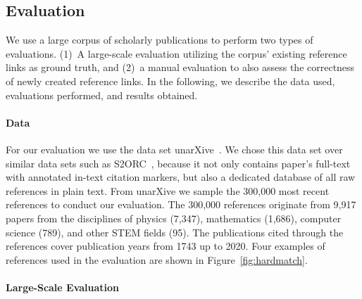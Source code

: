 \subsection{Evaluation}\label{sec:eval}

We use a large corpus of scholarly publications to perform two types of evaluations. (1)~A large-scale evaluation utilizing the corpus' existing reference links as ground truth, and (2)~a manual evaluation to also assess the correctness of newly created reference links. In the following, we describe the data used, evaluations performed, and results obtained.

\paragraph{Data}
For our evaluation we use the data set unarXive~\cite{Saier2020}. We chose this data set over similar data sets such as S2ORC~\cite{Lo2020}, because it not only contains paper's full-text with annotated in-text citation markers, but also a dedicated database of all raw references in plain text. From unarXive we sample the 300,000 most recent references to conduct our evaluation. The 300,000 references originate from 9,917 papers from the disciplines of physics (7,347), mathematics (1,686), computer science (789), and other STEM fields (95). The publications cited through the references cover publication years from 1743 up to 2020. Four examples of references used in the evaluation are shown in Figure~\ref{fig:hardmatch}.




\paragraph{Large-Scale Evaluation}

